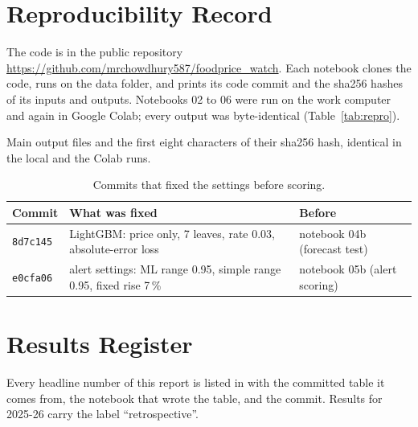 \chapter{Reproducibility Record}\label{app:repro}
The code is in the public repository \url{https://github.com/mrchowdhury587/foodprice_watch}. Each notebook clones the code, runs on the data folder, and prints its code commit and the sha256 hashes of its inputs and outputs. Notebooks 02 to 06 were run on the work computer and again in Google Colab; every output was byte-identical (Table~\ref{tab:repro}).

\begin{table}[H]\centering\small
\caption[Output files and their hashes]{Main output files and the first eight characters of their sha256 hash, identical in the local and the Colab runs.}\label{tab:repro}
\fittab{}
\end{table}

\begin{table}[H]\centering\small
\caption[Commits that fixed the settings]{Commits that fixed the settings before scoring.}\label{tab:commits}
\begin{adjustbox}{max width=\linewidth}\begin{tabular}{lll}
\toprule
\textbf{Commit} & \textbf{What was fixed} & \textbf{Before} \\
\midrule
\texttt{8d7c145} & LightGBM: price only, 7 leaves, rate 0.03, absolute-error loss & notebook 04b (forecast test) \\
\texttt{e0cfa06} & alert settings: ML range 0.95, simple range 0.95, fixed rise 7\,\% & notebook 05b (alert scoring) \\
\bottomrule
\end{tabular}\end{adjustbox}
\end{table}

\chapter{Results Register}\label{app:register}
Every headline number of this report is listed in  with the committed table it comes from, the notebook that wrote the table, and the commit. Results for 2025-26 carry the label ``retrospective''.

